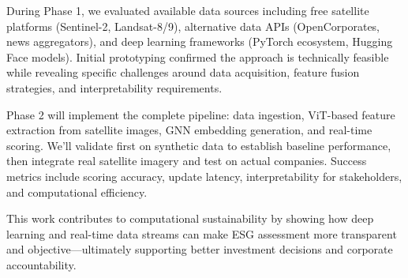 During Phase 1, we evaluated available data sources including free satellite platforms (Sentinel-2, Landsat-8/9), alternative data APIs (OpenCorporates, news aggregators), and deep learning frameworks (PyTorch ecosystem, Hugging Face models). Initial prototyping confirmed the approach is technically feasible while revealing specific challenges around data acquisition, feature fusion strategies, and interpretability requirements.

Phase 2 will implement the complete pipeline: data ingestion, ViT-based feature extraction from satellite images, GNN embedding generation, and real-time scoring. We'll validate first on synthetic data to establish baseline performance, then integrate real satellite imagery and test on actual companies. Success metrics include scoring accuracy, update latency, interpretability for stakeholders, and computational efficiency.

This work contributes to computational sustainability by showing how deep learning and real-time data streams can make ESG assessment more transparent and objective—ultimately supporting better investment decisions and corporate accountability.

